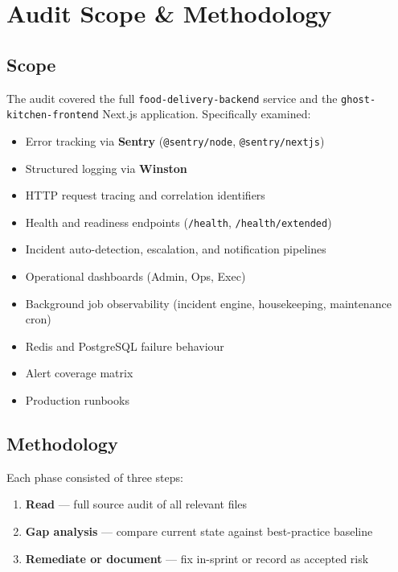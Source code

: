 \documentclass[12pt,a4paper]{article}
\begin{document}
\section{Audit Scope \& Methodology}

\subsection{Scope}

The audit covered the full \texttt{food-delivery-backend} service and the
\texttt{ghost-kitchen-frontend} Next.js application.  Specifically examined:

\begin{itemize}[leftmargin=*]
  \item Error tracking via \textbf{Sentry} (\texttt{@sentry/node}, \texttt{@sentry/nextjs})
  \item Structured logging via \textbf{Winston}
  \item HTTP request tracing and correlation identifiers
  \item Health and readiness endpoints (\texttt{/health}, \texttt{/health/extended})
  \item Incident auto-detection, escalation, and notification pipelines
  \item Operational dashboards (Admin, Ops, Exec)
  \item Background job observability (incident engine, housekeeping, maintenance cron)
  \item Redis and PostgreSQL failure behaviour
  \item Alert coverage matrix
  \item Production runbooks
\end{itemize}

\subsection{Methodology}

Each phase consisted of three steps:
\begin{enumerate}[leftmargin=*]
  \item \textbf{Read} — full source audit of all relevant files
  \item \textbf{Gap analysis} — compare current state against best-practice baseline
  \item \textbf{Remediate or document} — fix in-sprint or record as accepted risk
\end{enumerate}
\end{document}
